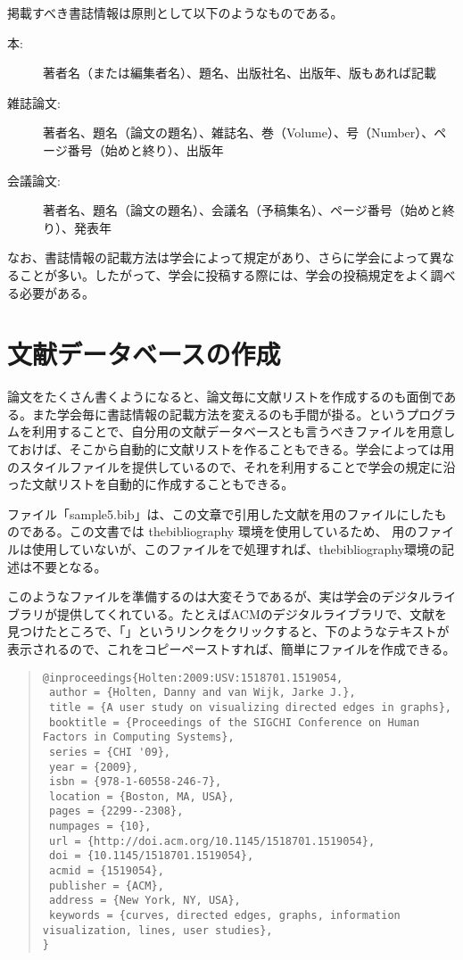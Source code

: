 \documentclass[fontsize=12pt,paper=a4]{jlreq}
\begin{document}
掲載すべき書誌情報は原則として以下のようなものである。

\begin{description}
\item[本:] 著者名（または編集者名）、題名、出版社名、出版年、版もあれば記載
\item[雑誌論文:] 著者名、題名（論文の題名）、雑誌名、巻（Volume）、号（Number）、ページ番号（始めと終り）、出版年
\item[会議論文:] 著者名、題名（論文の題名）、会議名（予稿集名）、ページ番号（始めと終り）、発表年
\end{description}

なお、書誌情報の記載方法は学会によって規定があり、さらに学会によって異なることが多い。したがって、学会に投稿する際には、学会の投稿規定をよく調べる必要がある。


\section{文献データベースの作成}

論文をたくさん書くようになると、論文毎に文献リストを作成するのも面倒である。また学会毎に書誌情報の記載方法を変えるのも手間が掛る。というプログラムを利用することで、自分用の文献データベースとも言うべきファイルを用意しておけば、そこから自動的に文献リストを作ることもできる。学会によっては用のスタイルファイルを提供しているので、それを利用することで学会の規定に沿った文献リストを自動的に作成することもできる。

ファイル「sample5.bib」は、この文章で引用した文献を用のファイルにしたものである。この文書では thebibliography 環境を使用しているため、 用のファイルは使用していないが、このファイルをで処理すれば、thebibliography環境の記述は不要となる。

このようなファイルを準備するのは大変そうであるが、実は学会のデジタルライブラリが提供してくれている。たとえばACMのデジタルライブラリで、文献\cite{holten2009}を見つけたところで、「」というリンクをクリックすると、下のようなテキストが表示されるので、これをコピーペーストすれば、簡単にファイルを作成できる。

\begin{quote}
\tiny
\begin{verbatim}
@inproceedings{Holten:2009:USV:1518701.1519054,
 author = {Holten, Danny and van Wijk, Jarke J.},
 title = {A user study on visualizing directed edges in graphs},
 booktitle = {Proceedings of the SIGCHI Conference on Human Factors in Computing Systems},
 series = {CHI '09},
 year = {2009},
 isbn = {978-1-60558-246-7},
 location = {Boston, MA, USA},
 pages = {2299--2308},
 numpages = {10},
 url = {http://doi.acm.org/10.1145/1518701.1519054},
 doi = {10.1145/1518701.1519054},
 acmid = {1519054},
 publisher = {ACM},
 address = {New York, NY, USA},
 keywords = {curves, directed edges, graphs, information visualization, lines, user studies},
} 
\end{verbatim}
\end{quote}
\end{document}
